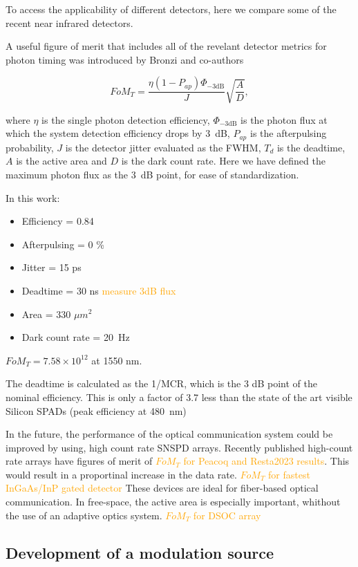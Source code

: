 \documentclass[11pt]{caltech_thesis} %
\begin{document}
To access the applicability of different detectors, here we compare some of the recent near infrared detectors.

A useful figure of merit that includes all of the revelant detector metrics for photon timing was introduced by Bronzi and co-authors \autocite{Bronzi2016}

$$FoM_T = \frac{\eta  (1 - P_{ap})\Phi_{-3 \text{dB}}}{J} \sqrt{\frac{A}{D}},$$

where $\eta$ is the single photon detection efficiency, $\Phi_{-3 \text{dB}}$ is the photon flux at which the system detection efficiency drops by 3~dB, $P_{ap}$ is the afterpulsing probability, $J$ is the detector jitter evaluated as the FWHM, $T_d$ is the deadtime, $A$ is the active area and $D$ is the dark count rate. Here we have defined the maximum photon flux as the 3~dB point, for ease of standardization.

In this work:

\begin{itemize}
\tightlist
\item
  Efficiency = 0.84
\item
  Afterpulsing = 0 \%
\item
  Jitter = 15 ps
\item
  Deadtime = 30 ns \textcolor{orange}{measure 3dB flux}
\item
  Area = 330 $\mu m^2$
\item
  Dark count rate = 20~Hz
\end{itemize}

$FoM_T = 7.58 \times 10^{12}$ at 1550 nm.

The deadtime is calculated as the 1/MCR, which is the 3 dB point of the nominal efficiency. This is only a factor of 3.7 less than the state of the art visible Silicon SPADs (peak efficiency at 480~nm) \autocite{Gramuglia2022}

In the future, the performance of the optical communication system could be improved by using, high count rate SNSPD arrays. Recently published high-count rate arrays have figures of merit of \textcolor{orange}{$FoM_T$ for Peacoq and Resta2023 results}. This would result in a proportinal increase in the data rate.
\textcolor{orange}{$FoM_T$ for fastest InGaAs/InP gated detector}
These devices are ideal for fiber-based optical communication. In free-space, the active area is especially important, whithout the use of an adaptive optics system.
\textcolor{orange}{$FoM_T$ for DSOC array}

\hypertarget{development-of-a-modulation-source}{%
\subsection{Development of a modulation source}\label{development-of-a-modulation-source}}
\end{document}
